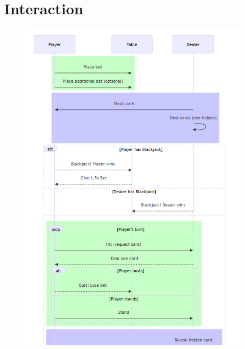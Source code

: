 \section{Interaction}

\begin{figure}[!htb]
    \centering
    \includegraphics[scale=0.55]{report/img/sequenceDiagram.png}
    \label{fig:classDiagram}
\end{figure}
